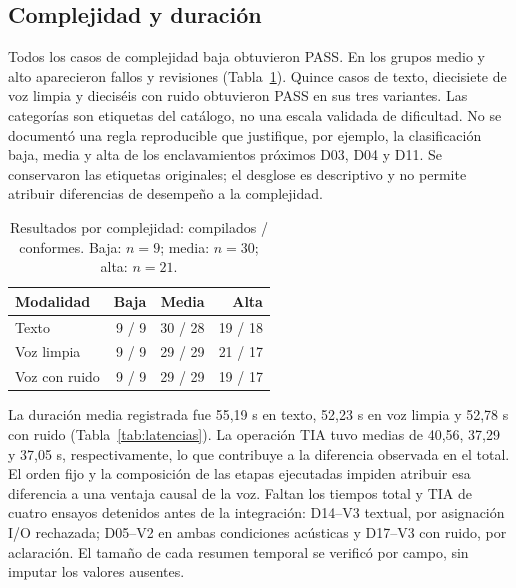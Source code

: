 \documentclass[a4paper,fleqn]{cas-dc}
\begin{document}
\subsection{Complejidad y duración}
Todos los casos de complejidad baja obtuvieron PASS. En los grupos medio y alto aparecieron fallos y revisiones (Tabla~\ref{tab:complejidad}). Quince casos de texto, diecisiete de voz limpia y dieciséis con ruido obtuvieron PASS en sus tres variantes. Las categorías son etiquetas del catálogo, no una escala validada de dificultad. No se documentó una regla reproducible que justifique, por ejemplo, la clasificación baja, media y alta de los enclavamientos próximos D03, D04 y D11. Se conservaron las etiquetas originales; el desglose es descriptivo y no permite atribuir diferencias de desempeño a la complejidad.
\begin{table}[H]
\caption{Resultados por complejidad: compilados / conformes. Baja: $n=9$; media: $n=30$; alta: $n=21$.}
\label{tab:complejidad}
\small
\begin{tabularx}{\linewidth}{@{}>{\raggedright\arraybackslash}X r r r@{}}
\toprule Modalidad & Baja & Media & Alta\\ \midrule
Texto & 9 / 9 & 30 / 28 & 19 / 18\\
Voz limpia & 9 / 9 & 29 / 29 & 21 / 17\\
Voz con ruido & 9 / 9 & 29 / 29 & 19 / 17\\
\bottomrule
\end{tabularx}
\end{table}
La duración media registrada fue 55,19 s en texto, 52,23 s en voz limpia y 52,78 s con ruido (Tabla~\ref{tab:latencias}). La operación TIA tuvo medias de 40,56, 37,29 y 37,05 s, respectivamente, lo que contribuye a la diferencia observada en el total. El orden fijo y la composición de las etapas ejecutadas impiden atribuir esa diferencia a una ventaja causal de la voz. Faltan los tiempos total y TIA de cuatro ensayos detenidos antes de la integración: D14--V3 textual, por asignación I/O rechazada; D05--V2 en ambas condiciones acústicas y D17--V3 con ruido, por aclaración. El tamaño de cada resumen temporal se verificó por campo, sin imputar los valores ausentes.
\end{document}

